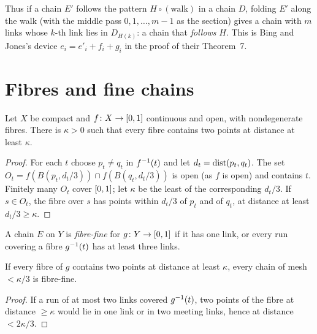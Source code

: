 Thus if a chain $E'$ follows the pattern $H\circ(\text{walk})$ in a chain $D$, folding $E'$ along the walk (with the middle pass $0,1,\dots,m-1$ as the section)
gives a chain with $m$ links whose $k$-th link lies in $D_{H(k)}$: a chain that \emph{follows} $H$. This is Bing and Jones's device
$e_i=e'_i+f_i+g_i$ in the proof of their Theorem~7.

\section{Fibres and fine chains}

\begin{lemma}\label{lem:fibre-spread}
Let $X$ be compact and $f\colon X\to[0,1]$ continuous and open, with nondegenerate fibres. There is $\kappa>0$ such that every fibre contains two points at
distance at least $\kappa$.
\end{lemma}

\begin{proof}
For each $t$ choose $p_t\ne q_t$ in $f^{-1}(t)$ and let $d_t=\operatorname{dist}(p_t,q_t)$. The set $O_t=f(B(p_t,d_t/3))\cap f(B(q_t,d_t/3))$ is open (as $f$ is open) and
contains $t$. Finitely many $O_t$ cover $[0,1]$; let $\kappa$ be the least of the corresponding $d_t/3$. If $s\in O_t$, the fibre over $s$ has points within
$d_t/3$ of $p_t$ and of $q_t$, at distance at least $d_t/3\ge\kappa$.
\end{proof}


\begin{definition}\label{def:fibre-fine}
A chain $E$ on $Y$ is \emph{fibre-fine} for $g\colon Y\to[0,1]$ if it has one link, or every run covering a fibre $g^{-1}(t)$ has at least three links.
\end{definition}


\begin{lemma}\label{lem:fibre-fine}
If every fibre of $g$ contains two points at distance at least $\kappa$, every chain of mesh $<\kappa/3$ is fibre-fine.
\end{lemma}

\begin{proof}
If a run of at most two links covered $g^{-1}(t)$, two points of the fibre at distance $\ge\kappa$ would lie in one link or in two meeting links, hence at
distance $<2\kappa/3$.
\end{proof}

